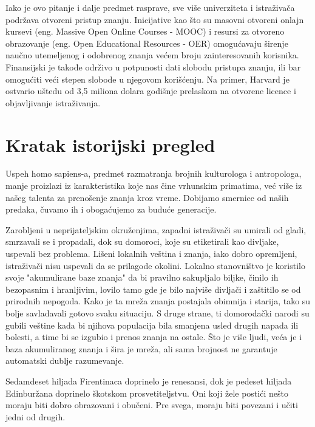\documentclass{article}
\begin{document}
Iako je ovo pitanje i dalje predmet rasprave, sve više univerziteta i istraživača podržava otvoreni pristup znanju. Inicijative kao što su masovni otvoreni onlajn kursevi (eng. Massive Open Online Courses - MOOC) i resursi za otvoreno obrazovanje (eng. Open Educational Resources - OER) omogućavaju širenje naučno utemeljenog i odobrenog znanja većem broju zainteresovanih korisnika. Finansijski je takođe održivo u potpunosti dati slobodu pristupa znanju, ili bar omogućiti veći stepen slobode u njegovom korišćenju. Na primer, Harvard je ostvario uštedu od 3,5 miliona dolara godišnje prelaskom na otvorene licence i objavljivanje istraživanja.


\section{Kratak istorijski pregled}

Uspeh homo sapiens-a, predmet razmatranja brojnih kulturologa i antropologa, manje proizlazi iz karakteristika koje nas čine vrhunskim primatima, već više iz našeg talenta za prenošenje znanja kroz vreme. Dobijamo smernice od naših predaka, čuvamo ih i obogaćujemo za buduće generacije.

Zarobljeni u neprijateljskim okruženjima, zapadni istraživači su umirali od gladi, smrzavali se i propadali, dok su domoroci, koje su etiketirali kao divljake, uspevali bez problema. Lišeni lokalnih veština i znanja, iako dobro opremljeni, istraživači nisu uspevali da se prilagode okolini. Lokalno stanovništvo je koristilo svoje "akumulirane baze znanja" da bi pravilno sakupljalo biljke, činilo ih bezopasnim i hranljivim, lovilo tamo gde je bilo najviše divljači i zaštitilo se od prirodnih nepogoda. Kako je ta mreža znanja postajala obimnija i starija, tako su bolje savladavali gotovo svaku situaciju. S druge strane, ti domorodački narodi su gubili veštine kada bi njihova populacija bila smanjena usled drugih napada ili bolesti, a time bi se izgubio i prenos znanja na ostale. Što je više ljudi, veća je i baza akumuliranog znanja i šira je mreža, ali sama brojnost ne garantuje automatski dublje razumevanje.

Sedamdeset hiljada Firentinaca doprinelo je renesansi, dok je pedeset hiljada Edinburžana doprinelo škotskom prosvetiteljstvu. Oni koji žele postići nešto moraju biti dobro obrazovani i obučeni. Pre svega, moraju biti povezani i učiti jedni od drugih.
\end{document}
